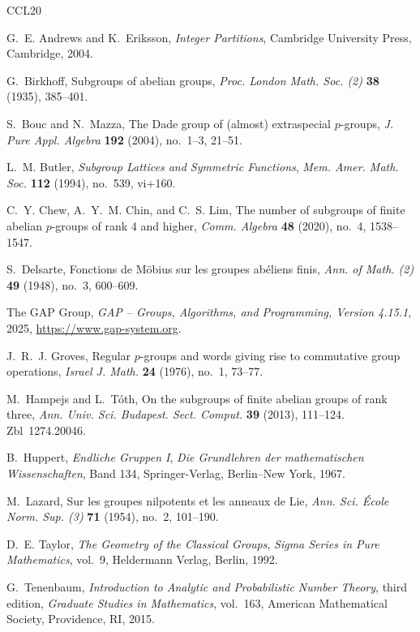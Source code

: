 \documentclass[a4paper,11pt,reqno]{amsart}
\theoremstyle{plain}
\theoremstyle{remark}
\numberwithin{equation}{section}
\begin{document}
\begin{thebibliography}{CCL20}

G.~E. Andrews and K.~Eriksson,
\emph{Integer Partitions},
Cambridge University Press, Cambridge, 2004.

G.~Birkhoff,
Subgroups of abelian groups,
\emph{Proc. London Math. Soc. (2)} \textbf{38} (1935), 385--401.

S.~Bouc and N.~Mazza,
The Dade group of (almost) extraspecial $p$-groups,
\emph{J. Pure Appl. Algebra} \textbf{192} (2004), no.~1--3, 21--51.

L.~M. Butler,
\emph{Subgroup Lattices and Symmetric Functions},
\emph{Mem. Amer. Math. Soc.} \textbf{112} (1994), no.~539, vi+160.

C.~Y. Chew, A.~Y.~M. Chin, and C.~S. Lim,
The number of subgroups of finite abelian $p$-groups of rank 4 and higher,
\emph{Comm. Algebra} \textbf{48} (2020), no.~4, 1538--1547.

S.~Delsarte,
Fonctions de M\"obius sur les groupes ab\'eliens finis,
\emph{Ann. of Math. (2)} \textbf{49} (1948), no.~3, 600--609.

The GAP Group, \emph{GAP -- Groups, Algorithms, and Programming,
Version 4.15.1}, 2025, \url{https://www.gap-system.org}.

J.~R.~J. Groves,
Regular $p$-groups and words giving rise to commutative group operations,
\emph{Israel J. Math.} \textbf{24} (1976), no.~1, 73--77.

M.~Hampejs and L.~T\'oth,
On the subgroups of finite abelian groups of rank three,
\emph{Ann. Univ. Sci. Budapest. Sect. Comput.} \textbf{39} (2013), 111--124.
Zbl~1274.20046.

B.~Huppert,
\emph{Endliche Gruppen I},
\emph{Die Grundlehren der mathematischen Wissenschaften}, Band 134,
Springer-Verlag, Berlin--New York, 1967.

M.~Lazard,
Sur les groupes nilpotents et les anneaux de Lie,
\emph{Ann. Sci. École Norm. Sup. (3)} \textbf{71} (1954), no.~2, 101--190.

D.~E. Taylor,
\emph{The Geometry of the Classical Groups},
\emph{Sigma Series in Pure Mathematics}, vol.~9,
Heldermann Verlag, Berlin, 1992.

G.~Tenenbaum,
\emph{Introduction to Analytic and Probabilistic Number Theory},
third edition,
\emph{Graduate Studies in Mathematics}, vol.~163,
American Mathematical Society, Providence, RI, 2015.


\end{thebibliography}
\end{document}
